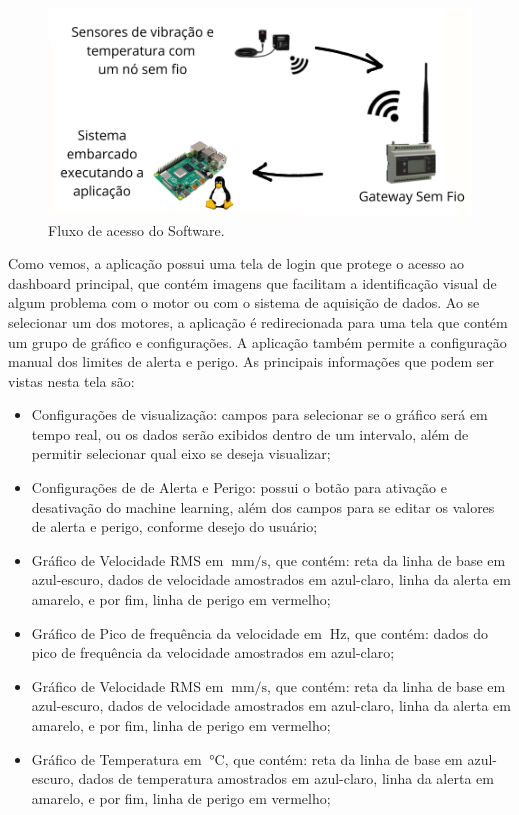 \begin{figure}[H]
    \caption{Fluxo de acesso do Software.}
    \begin{center}
        \includegraphics[scale=0.8, page=2]{metodologia/img/fluxo_layout.pdf}
    \end{center}
    \label{fig:fluxo_software}
\end{figure}

Como vemos, a aplicação possui uma tela de login que protege o acesso ao dashboard principal, que contém imagens que facilitam a identificação
visual de algum problema com o motor ou com o sistema de aquisição de dados. Ao se selecionar um dos motores, a aplicação é redirecionada para
uma tela que contém um grupo de gráfico e configurações. A aplicação também permite a configuração manual dos limites de alerta e perigo. As 
principais informações que podem ser vistas nesta tela são: 

\begin{itemize}
    \item Configurações de visualização: campos para selecionar se o gráfico será em tempo real, ou os dados serão exibidos dentro de um
intervalo, além de permitir selecionar qual eixo se deseja visualizar;
    \item Configurações de de Alerta e Perigo: possui o botão para ativação e desativação do machine learning, além dos campos para se editar
os valores de alerta e perigo, conforme desejo do usuário;
    \item Gráfico de Velocidade RMS em $\SI{}{\milli\metre\per\second}$, que contém: reta da linha de base em azul-escuro, dados de velocidade
amostrados em azul-claro, linha da alerta em amarelo, e por fim, linha de perigo em vermelho;
    \item Gráfico de Pico de frequência da velocidade em $\SI{}{\hertz}$, que contém: dados do pico de frequência da velocidade amostrados em 
    azul-claro; 
    \item Gráfico de Velocidade RMS em $\SI{}{\milli\metre\per\second}$, que contém: reta da linha de base em azul-escuro, dados de velocidade
amostrados em azul-claro, linha da alerta em amarelo, e por fim, linha de perigo em vermelho;
    \item Gráfico de Temperatura em $\SI{}{\celsius}$, que contém: reta da linha de base em azul-escuro, dados de temperatura
amostrados em azul-claro, linha da alerta em amarelo, e por fim, linha de perigo em vermelho;
\end{itemize}

